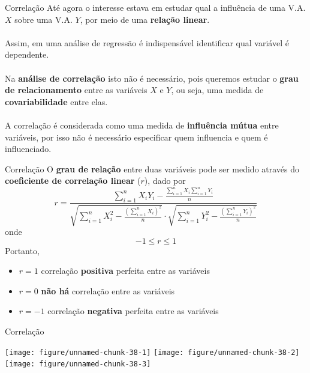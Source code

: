 \documentclass[10pt]{beamer}\usepackage[]{graphicx}\usepackage[]{color}
\newenvironment{knitrout}{}{} %
\theoremstyle{definition}
\begin{document}
\begin{frame}[fragile]{Correlação}
  Até agora o interesse estava em estudar qual a influência de uma
  V.A. $X$ sobre uma V.A. $Y$, por meio de uma \textbf{relação linear}. \\~\\
  Assim, em uma análise de regressão é indispensável identificar qual
  variável é dependente. \\~\\
  Na \textbf{análise de correlação} isto não é necessário, pois queremos
  estudar o \textbf{grau de relacionamento} entre as variáveis $X$ e
  $Y$, ou seja, uma medida de \textbf{covariabilidade} entre elas. \\~\\
  A correlação é considerada como uma medida de \textbf{influência
    mútua} entre variáveis, por isso não é necessário especificar quem
  influencia e quem é influenciado.
\end{frame}

\begin{frame}[fragile]{Correlação}
  O \textbf{grau de relação} entre duas variáveis pode ser medido
  através do \textbf{coeficiente de correlação linear} ($r$), dado por
  \begin{equation*}
    r = \frac{\sum_{i=1}^{n} X_iY_i - \frac{\sum_{i=1}^{n}
        X_i \sum_{i=1}^{n} Y_i}{n}}{\sqrt{\sum_{i=1}^{n}X_i^2 -
      \frac{(\sum_{i=1}^{n} X_i)^2}{n}} \cdot \sqrt{\sum_{i=1}^{n}Y_i^2 -
      \frac{(\sum_{i=1}^{n} Y_i)^2}{n}}}
  \end{equation*}
  onde
  \begin{equation*}
    -1 \leq r \leq 1
  \end{equation*}
  Portanto,
  \begin{itemize}
  \item $r=1$ correlação \textbf{positiva} perfeita entre as variáveis
  \item $r=0$ \textbf{não há} correlação entre as variáveis
  \item $r= -1$ correlação \textbf{negativa} perfeita entre as variáveis
  \end{itemize}
\end{frame}

\begin{frame}[fragile]{Correlação}
\begin{knitrout}\small
{}\color{fgcolor}

{\centering \texttt{[image: figure/unnamed-chunk-38-1]} 
\texttt{[image: figure/unnamed-chunk-38-2]} 
\texttt{[image: figure/unnamed-chunk-38-3]} 

}



\end{knitrout}
\end{frame}
\end{document}
